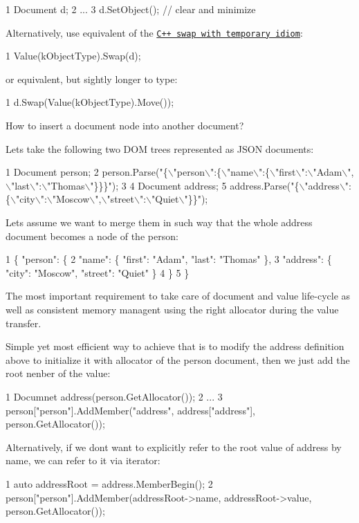 \begin{DoxyCode}
1 Document d;
2 ...
3 d.SetObject();  // clear and minimize
\end{DoxyCode}


Alternatively, use equivalent of the \href{https://en.wikibooks.org/wiki/More_C%2B%2B_Idioms/Clear-and-minimize}{\tt C++ swap with temporary idiom}\+: 
\begin{DoxyCode}
1 Value(kObjectType).Swap(d);
\end{DoxyCode}
 or equivalent, but sightly longer to type\+: 
\begin{DoxyCode}
1 d.Swap(Value(kObjectType).Move()); 
\end{DoxyCode}



\begin{DoxyEnumerate}
\item How to insert a document node into another document?

Let\textquotesingle{}s take the following two D\+OM trees represented as J\+S\+ON documents\+: 
\begin{DoxyCode}
1 Document person;
2 person.Parse("\{\(\backslash\)"person\(\backslash\)":\{\(\backslash\)"name\(\backslash\)":\{\(\backslash\)"first\(\backslash\)":\(\backslash\)"Adam\(\backslash\)",\(\backslash\)"last\(\backslash\)":\(\backslash\)"Thomas\(\backslash\)"\}\}\}");
3 
4 Document address;
5 address.Parse("\{\(\backslash\)"address\(\backslash\)":\{\(\backslash\)"city\(\backslash\)":\(\backslash\)"Moscow\(\backslash\)",\(\backslash\)"street\(\backslash\)":\(\backslash\)"Quiet\(\backslash\)"\}\}");
\end{DoxyCode}
 Let\textquotesingle{}s assume we want to merge them in such way that the whole {\ttfamily address} document becomes a node of the {\ttfamily person}\+: 
\begin{DoxyCode}
1 \{ "person": \{
2    "name": \{ "first": "Adam", "last": "Thomas" \},
3    "address": \{ "city": "Moscow", "street": "Quiet" \}
4    \}
5 \}
\end{DoxyCode}


The most important requirement to take care of document and value life-\/cycle as well as consistent memory managent using the right allocator during the value transfer.

Simple yet most efficient way to achieve that is to modify the {\ttfamily address} definition above to initialize it with allocator of the {\ttfamily person} document, then we just add the root nenber of the value\+: 
\begin{DoxyCode}
1 Documnet address(person.GetAllocator());
2 ...
3 person["person"].AddMember("address", address["address"], person.GetAllocator());
\end{DoxyCode}
 Alternatively, if we don\textquotesingle{}t want to explicitly refer to the root value of {\ttfamily address} by name, we can refer to it via iterator\+: 
\begin{DoxyCode}
1 auto addressRoot = address.MemberBegin();
2 person["person"].AddMember(addressRoot->name, addressRoot->value, person.GetAllocator());
\end{DoxyCode}



\end{DoxyEnumerate}
